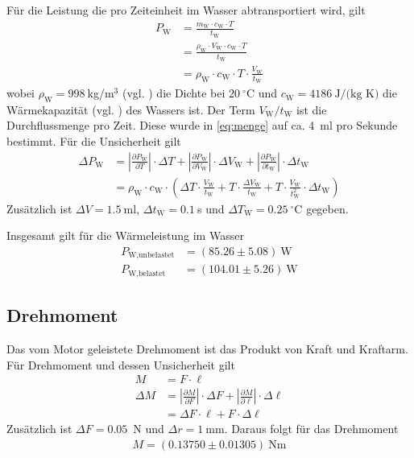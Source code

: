 \documentclass{article}
\begin{document}
Für die Leistung die pro Zeiteinheit im Wasser abtransportiert wird, gilt
\begin{align}
P_\text{W} &= \frac{m_\text{W} \cdot c_\text{W} \cdot T}{ t_\text{W}} \\
&= \frac{\rho_\text{W} \cdot V_\text{W} \cdot c_\text{W} \cdot T}{ t_\text{W}} \\
&= \rho_\text{W}  \cdot c_\text{W} \cdot T\cdot\frac{ V_\text{W}}{ t_\text{W}}
\end{align}
wobei $\rho_\text{W} = 998~$kg/m${}^3$ (vgl. \cite{wasser_dichte}) die Dichte bei $20~^\circ$C und $c_\text{W} = 4186~\text{J/(kg K)}$ die Wärmekapazität (vgl. \cite{giancoli}) des Wassers ist. Der Term $V_\text{W} / t_\text{W}$ ist die Durchflussmenge pro Zeit. Diese wurde in \eqref{eq:menge} auf ca. 4~ml pro Sekunde bestimmt. Für die Unsicherheit gilt
\begin{align}
\Delta P_\text{W} &= \left| \frac{\partial P_\text{W}}{\partial T}\right| \cdot \Delta T + \left| \frac{\partial P_\text{W}}{\partial V_\text{W}}\right| \cdot \Delta V_\text{W} + \left| \frac{\partial P_\text{W}}{\partial t_\text{W}}\right| \cdot \Delta t_\text{W} \\
&= \rho_\text{W} \cdot c_\text{W} \cdot \left( \Delta T \cdot \frac{V_\text{W}}{t_\text{W}} + T\cdot \frac{\Delta V_\text{W}}{t_\text{W}} + T\cdot \frac{V_\text{W}}{t_\text{W}^2}\cdot \Delta t_\text{W} \right)
\end{align}
Zusätzlich ist $\Delta V = 1.5~$ml, $\Delta t_\text{W} = 0.1~$s und $\Delta T_\text{W} = 0.25~^\circ$C gegeben.


Insgesamt gilt für die Wärmeleistung im Wasser
\begin{align*}
P_{\text{W},\text{unbelastet}} &= (85.26 \pm 5.08)~\text{W} \\
P_{\text{W},\text{belastet}} &= (104.01 \pm 5.26)~\text{W} 
\end{align*}



\subsection{Drehmoment}

Das vom Motor geleistete Drehmoment ist das Produkt von Kraft und Kraftarm. Für Drehmoment und dessen Unsicherheit gilt
\begin{align}
M &= F\cdot \ell \\
\Delta M &= \left| \frac{\partial M}{\partial F}\right| \cdot \Delta F + \left| \frac{\partial M}{\partial \ell}\right| \cdot \Delta \ell \\
&= \Delta F \cdot \ell + F \cdot \Delta \ell
\end{align}
Zusätzlich ist $\Delta F = 0.05$~N und $\Delta r  = 1~$mm. Daraus folgt für das Drehmoment
\begin{align*}
M = (0.13750 \pm 0.01305)~\text{Nm}
\end{align*}
\end{document}
